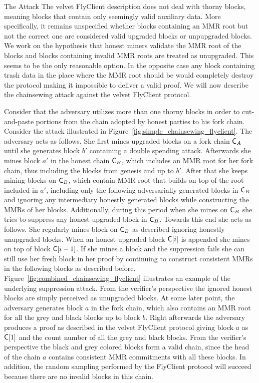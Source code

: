 \begin{section}{The Attack}
	The  velvet FlyClient description does not deal with thorny blocks, meaning blocks that contain only seemingly valid auxiliary data. More specifically, it remains unspecified whether blocks containing an MMR root but not the correct one are considered valid upgraded blocks or unpupgraded blocks. We work on the hypothesis that honest miners validate the MMR root of the blocks and blocks containing invalid MMR roots are treated as unupgraded. This seems to be the only reasonable option. In the opposite case any block containing trash data in the place where the MMR root should be would completely destroy the protocol making it impossible to deliver a valid proof. We will now describe the chainsewing attack against the velvet FlyClient protocol.

	Consider that the adversary utilizes more than one thorny blocks in order to cut-and-paste portions from the chain adopted by honest parties to his fork chain. 
	Consider the attack illustrated in Figure~\ref{fig:simple_chainsewing_flyclient}. The adversary acts as follows. She first mines upgraded blocks on a fork chain $\mathsf{C}_A$ until she generates block $b'$ containing a double spending attack. Afterwards she mines block $a'$ in the honest chain $\mathsf{C}_B$, which includes an MMR root for her fork chain, thus including the blocks from genesis and up to $b'$. After that she keeps mining blocks on $\mathsf{C}_B$, which contain MMR root that builds on top of the root included in $a'$, including only the following adversarially generated blocks in $\mathsf{C}_B$ and ignoring any intermediary honestly generated blocks while constructing the MMRs of her blocks. Additionally, during this period when she mines on $\mathsf{C}_B$ she tries to suppress any honest upgraded block in $\mathsf{C}_B$. Towards this end she acts as follows. She regularly mines block on $\mathsf{C}_B$ as described ignoring honestly unupgraded blocks. When an honest upgraded block $\mathsf{C}[i]$ is appended she mines on top of block $\mathsf{C}[i-1]$. If she mines a block and the suppression fails she can still use her fresh block in her proof by continuing to construct consistent MMRs in the following blocks as described before. Figure~\ref{fig:combined_chainsewing_flyclient} illustrates an example of the underlying suppression attack.
	From the verifier's perspective the ignored honest blocks are simply perceived as unupgraded blocks. At some later point, the adversary generates block $a$ in the fork chain, which also contains an MMR root for all the grey and black blocks up to block $b$. Right afterwards the adversary produces a proof as described in the velvet FlyClient protocol giving block $a$ as $\mathsf{C}[1]$ and the count number of all the grey and black blocks. From the verifier's perspective the black and grey colored blocks form a valid chain, since the head of the chain $a$ contains consistent MMR commitments with all these blocks. In addition, the random sampling performed by the FlyClient protocol will succeed because there are no invalid blocks in this chain.


\end{section}
